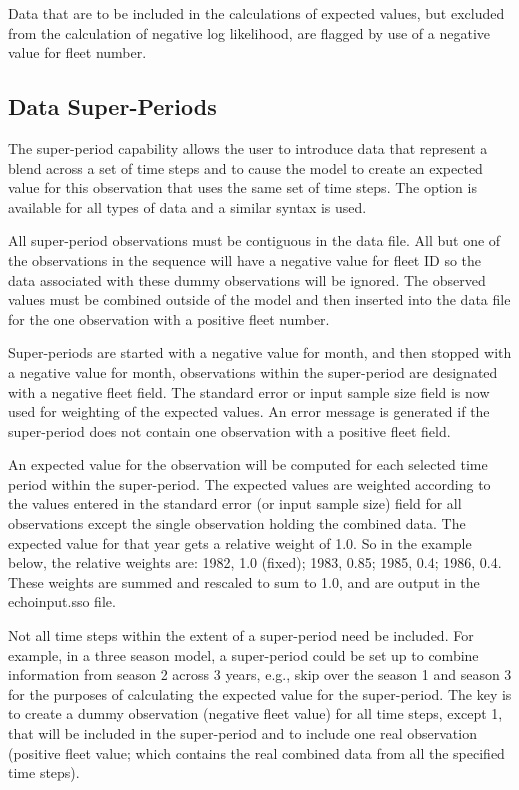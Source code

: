 Data that are to be included in the calculations of expected values, but excluded from the calculation of negative log likelihood, are flagged by use of a negative value for fleet number.

\hypertarget{SuperPeriod}{}
\subsection{Data Super-Periods}
The super-period capability allows the user to introduce data that represent a blend across a set of time steps and to cause the model to create an expected value for this observation that uses the same set of time steps. The option is available for all types of data and a similar syntax is used. 

All super-period observations must be contiguous in the data file. All but one of the observations in the sequence will have a negative value for fleet ID so the data associated with these dummy observations will be ignored. The observed values must be combined outside of the model and then inserted into the data file for the one observation with a positive fleet number.

Super-periods are started with a negative value for month, and then stopped with a negative value for month,  observations within the super-period are designated with a negative fleet field. The standard error or input sample size field is now used for weighting of the expected values. An error message is generated if the super-period does not contain one observation with a positive fleet field.

An expected value for the observation will be computed for each selected time period within the super-period. The expected values are weighted according to the values entered in the standard error (or input sample size) field for all observations except the single observation holding the combined data. The expected value for that year gets a relative weight of 1.0. So in the example below, the relative weights are: 1982, 1.0 (fixed); 1983, 0.85; 1985, 0.4; 1986, 0.4. These weights are summed and rescaled to sum to 1.0, and are output in the echoinput.sso file.

Not all time steps within the extent of a super-period need be included. For example, in a three season model, a super-period could be set up to combine information from season 2 across 3 years, e.g., skip over the season 1 and season 3 for the purposes of calculating the expected value for the super-period. The key is to create a dummy observation (negative fleet value) for all time steps, except 1, that will be included in the super-period and to include one real observation (positive fleet value; which contains the real combined data from all the specified time steps).

